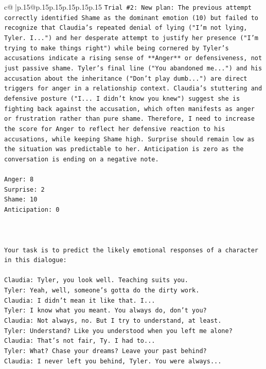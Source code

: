 \documentclass{article}
\begin{document}
{\begin{supertabular}{c@{$\;$}|p{.15\linewidth}@{}p{.15\linewidth}p{.15\linewidth}p{.15\linewidth}p{.15\linewidth}p{.15\linewidth}}
{{{\texttt{Trial \#2: New plan: The previous attempt correctly identified Shame as the dominant emotion (10) but failed to recognize that Claudia's repeated denial of lying ("I'm not lying, Tyler. I...") and her desperate attempt to justify her presence ("I'm trying to make things right") while being cornered by Tyler's accusations indicate a rising sense of **Anger** or defensiveness, not just passive shame. Tyler's final line ("You abandoned me...") and his accusation about the inheritance ("Don't play dumb...") are direct triggers for anger in a relationship context. Claudia's stuttering and defensive posture ("I... I didn't know you knew") suggest she is fighting back against the accusation, which often manifests as anger or frustration rather than pure shame. Therefore, I need to increase the score for Anger to reflect her defensive reaction to his accusations, while keeping Shame high. Surprise should remain low as the situation was predictable to her. Anticipation is zero as the conversation is ending on a negative note.} \\
\\ 
\texttt{Anger: 8} \\
\texttt{Surprise: 2} \\
\texttt{Shame: 10} \\
\texttt{Anticipation: 0} \\
\\ 
\\ 
\\ 
\texttt{Your task is to predict the likely emotional responses of a character in this dialogue:} \\
\\ 
\texttt{Claudia: Tyler, you look well. Teaching suits you.} \\
\texttt{Tyler: Yeah, well, someone's gotta do the dirty work.} \\
\texttt{Claudia: I didn't mean it like that. I...} \\
\texttt{Tyler: I know what you meant. You always do, don't you?} \\
\texttt{Claudia: Not always, no. But I try to understand, at least.} \\
\texttt{Tyler: Understand? Like you understood when you left me alone?} \\
\texttt{Claudia: That's not fair, Ty. I had to...} \\
\texttt{Tyler: What? Chase your dreams? Leave your past behind?} \\
\texttt{Claudia: I never left you behind, Tyler. You were always...} \\
}}}
\end{supertabular}}
\end{document}
